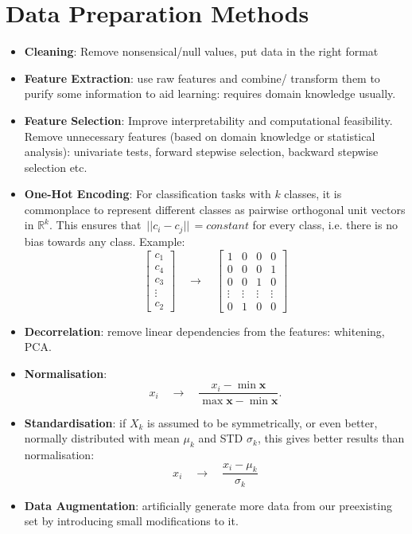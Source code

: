 \documentclass{article}
\renewcommand{\vec}[1]{\mathbf{#1}}
\newcommand{\norm}[1]{\,||#1||\,}
\newcommand{\Reals}{\mathbb{R}}
\begin{document}
\section{Data Preparation Methods}
\begin{itemize}
\item \textbf{Cleaning}: Remove nonsensical/null values, put data in the right
  format
\item \textbf{Feature Extraction}: use raw features and combine/ transform them
  to purify some information to aid learning: requires domain knowledge usually.
\item \textbf{Feature Selection}: Improve interpretability and computational
  feasibility. Remove unnecessary features (based on domain knowledge or
  statistical analysis): univariate tests, forward stepwise selection, backward
  stepwise selection etc.
\item \textbf{One-Hot Encoding}: For classification tasks with $k$ classes, it is commonplace to
  represent different classes as pairwise orthogonal unit vectors in $\Reals^k$.
  This ensures that $\norm{c_i - c_j} = constant$ for every class, i.e. there is
  no bias towards any class. Example:
  \[
    \begin{bmatrix}
      c_1 \\
      c_4 \\
      c_3 \\
      \vdots \\
      c_2
    \end{bmatrix}
    \quad \to \quad
    \begin{bmatrix}
      1 & 0 & 0 & 0 \\
      0 & 0 & 0 & 1 \\
      0 & 0 & 1 & 0 \\
      \vdots & \vdots & \vdots & \vdots \\
      0 & 1 & 0 & 0
    \end{bmatrix}
  \]
\item \textbf{Decorrelation}: remove linear dependencies from the features:
  whitening, PCA.
\item \textbf{Normalisation}:
  \[
    x_i \quad \to \quad \frac{x_i - \min{\vec{x}}}{\max{\vec{x}} - \min{\vec{x}}}.
  \]
\item \textbf{Standardisation}:
  if $X_k$ is assumed to be symmetrically, or even better, normally distributed
  with mean $\mu_k$ and STD $\sigma_k$, this gives better results than normalisation:
  \[
    x_i \quad \to \quad \frac{x_i - \mu_k}{\sigma_k} 
  \]
\item \textbf{Data Augmentation}: artificially generate more data from our
  preexisting set by introducing small modifications to it.
\end{itemize}
\end{document}
